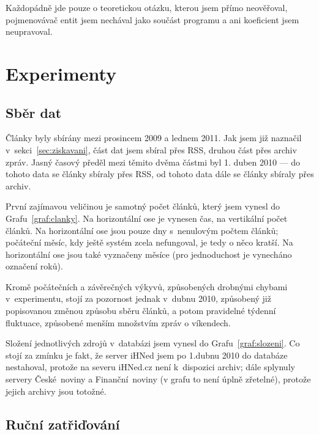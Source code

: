 \documentclass[12pt,a4paper]{report}
\begin{document}
Každopádně jde pouze o teoretickou otázku, kterou jsem přímo neověřoval, pojmenovávač entit jsem nechával jako součást programu a ani koeficient jsem neupravoval.


\chapter{Experimenty}
\label{sec:experimenty}


\section {Sběr dat}
\label{sec:sberdat}

Články byly sbírány mezi prosincem 2009 a lednem 2011. Jak jsem již naznačil v~sekci~\ref{sec:ziskavani}, část dat jsem sbíral přes RSS, druhou část přes archiv zpráv. Jasný časový předěl mezi těmito dvěma částmi byl 1. duben 2010 --- do tohoto data se články sbíraly přes RSS, od tohoto data dále se články sbíraly přes archiv.


První zajímavou veličinou je samotný počet článků, který jsem vynesl do Grafu~\ref{graf:clanky}. Na horizontální ose je vynesen čas, na vertikální počet článků. Na horizontální ose jsou pouze dny s~nenulovým počtem článků; počáteční měsíc, kdy ještě systém zcela nefungoval, je tedy o něco kratší. Na horizontální ose jsou také vyznačeny měsíce (pro jednoduchost je vynecháno označení roků).

Kromě počátečních a závěrečných výkyvů, způsobených drobnými chybami v~experimentu, stojí za pozornost jednak  v~dubnu 2010, způsobený již popisovanou změnou způsobu sběru článků, a potom pravidelné týdenní fluktuace, způsobené menším množstvím zpráv o víkendech.


Složení jednotlivých zdrojů v~databázi jsem vynesl do Grafu~\ref{graf:slozeni}. Co stojí za zmínku je fakt, že server iHNed jsem po 1.dubnu 2010 do databáze nestahoval, protože na severu iHNed.cz není k~dispozici archiv; dále splynuly servery České~noviny a Finanční~noviny (v grafu to není úplně zřetelné), protože jejich archivy jsou totožné.

\section{Ruční zatřiďování}
\label{sec:rucnik}
\end{document}
